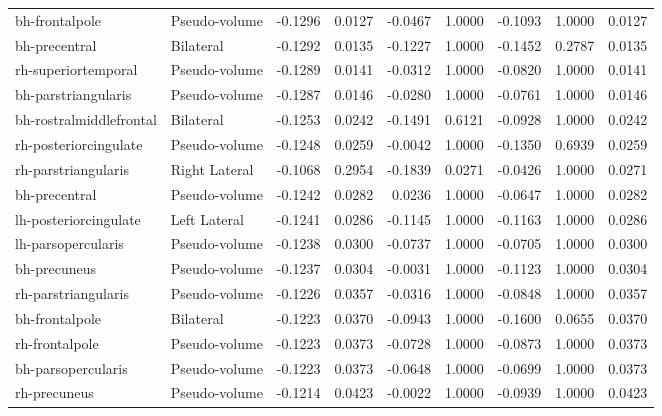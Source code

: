 \documentclass{article}
\begin{document}
\begin{table}
\begin{tabular}{llrrrrrrr}
	bh-frontalpole & Pseudo-volume & -0.1296 & 0.0127 & -0.0467 & 1.0000 & -0.1093 & 1.0000 & 0.0127 \\
	bh-precentral & Bilateral & -0.1292 & 0.0135 & -0.1227 & 1.0000 & -0.1452 & 0.2787 & 0.0135 \\
	rh-superiortemporal & Pseudo-volume & -0.1289 & 0.0141 & -0.0312 & 1.0000 & -0.0820 & 1.0000 & 0.0141 \\
	bh-parstriangularis & Pseudo-volume & -0.1287 & 0.0146 & -0.0280 & 1.0000 & -0.0761 & 1.0000 & 0.0146 \\
	bh-rostralmiddlefrontal & Bilateral & -0.1253 & 0.0242 & -0.1491 & 0.6121 & -0.0928 & 1.0000 & 0.0242 \\
	rh-posteriorcingulate & Pseudo-volume & -0.1248 & 0.0259 & -0.0042 & 1.0000 & -0.1350 & 0.6939 & 0.0259 \\
	rh-parstriangularis & Right Lateral & -0.1068 & 0.2954 & -0.1839 & 0.0271 & -0.0426 & 1.0000 & 0.0271 \\
	bh-precentral & Pseudo-volume & -0.1242 & 0.0282 & 0.0236 & 1.0000 & -0.0647 & 1.0000 & 0.0282 \\
	lh-posteriorcingulate & Left Lateral & -0.1241 & 0.0286 & -0.1145 & 1.0000 & -0.1163 & 1.0000 & 0.0286 \\
	lh-parsopercularis & Pseudo-volume & -0.1238 & 0.0300 & -0.0737 & 1.0000 & -0.0705 & 1.0000 & 0.0300 \\
	bh-precuneus & Pseudo-volume & -0.1237 & 0.0304 & -0.0031 & 1.0000 & -0.1123 & 1.0000 & 0.0304 \\
	rh-parstriangularis & Pseudo-volume & -0.1226 & 0.0357 & -0.0316 & 1.0000 & -0.0848 & 1.0000 & 0.0357 \\
	bh-frontalpole & Bilateral & -0.1223 & 0.0370 & -0.0943 & 1.0000 & -0.1600 & 0.0655 & 0.0370 \\
	rh-frontalpole & Pseudo-volume & -0.1223 & 0.0373 & -0.0728 & 1.0000 & -0.0873 & 1.0000 & 0.0373 \\
	bh-parsopercularis & Pseudo-volume & -0.1223 & 0.0373 & -0.0648 & 1.0000 & -0.0699 & 1.0000 & 0.0373 \\
	rh-precuneus & Pseudo-volume & -0.1214 & 0.0423 & -0.0022 & 1.0000 & -0.0939 & 1.0000 & 0.0423 \\

\end{tabular}
\end{table}
\end{document}
